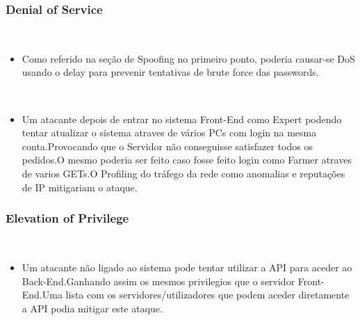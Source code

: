 \subsubsection{Denial of Service}
\hfill\\
\begin{itemize}

\item Como referido na seção de Spoofing no primeiro ponto, poderia causar-se DoS usando o delay para prevenir tentativas de brute force das passwords.

\hfill\\
\item Um atacante depois de entrar no sistema Front-End como Expert podendo tentar atualizar o sistema atraves de vários PCs com login na mesma conta.Provocando que o Servidor não conseguisse satisfazer todos os pedidos.O mesmo poderia ser feito caso fosse feito login como Farmer atraves de varios GETs.O Profiling do tráfego da rede como anomalias e reputações de IP mitigariam o ataque.

\end{itemize}

\subsubsection{Elevation of Privilege}
\hfill\\

\begin{itemize}

\item Um atacante não ligado ao sistema pode tentar utilizar a API para aceder ao Back-End.Ganhando assim os mesmos privilegios que o servidor Front-End.Uma lista com os servidores/utilizadores que podem aceder diretamente a API podia mitigar este ataque.

\end{itemize}

\hfill\\


